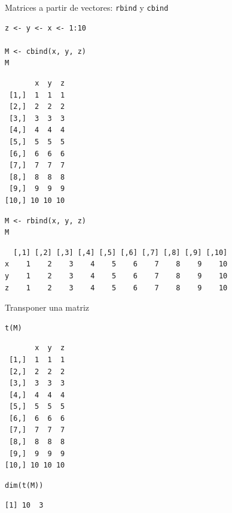 \documentclass[xcolor={usenames,svgnames,dvipsnames}]{beamer}
\begin{document}
\begin{frame}[fragile,label=sec-2-2-2]{Matrices a partir de vectores: \texttt{rbind} y \texttt{cbind}}
 \lstset{language=R,label= ,caption= ,numbers=none}
\begin{lstlisting}
z <- y <- x <- 1:10

M <- cbind(x, y, z)
M
\end{lstlisting}

\begin{verbatim}
       x  y  z
 [1,]  1  1  1
 [2,]  2  2  2
 [3,]  3  3  3
 [4,]  4  4  4
 [5,]  5  5  5
 [6,]  6  6  6
 [7,]  7  7  7
 [8,]  8  8  8
 [9,]  9  9  9
[10,] 10 10 10
\end{verbatim}

\lstset{language=R,label= ,caption= ,numbers=none}
\begin{lstlisting}
M <- rbind(x, y, z)
M
\end{lstlisting}

\begin{verbatim}
  [,1] [,2] [,3] [,4] [,5] [,6] [,7] [,8] [,9] [,10]
x    1    2    3    4    5    6    7    8    9    10
y    1    2    3    4    5    6    7    8    9    10
z    1    2    3    4    5    6    7    8    9    10
\end{verbatim}
\end{frame}

\begin{frame}[fragile,label=sec-2-2-3]{Transponer una matriz}
 \lstset{language=R,label= ,caption= ,numbers=none}
\begin{lstlisting}
t(M)
\end{lstlisting}

\begin{verbatim}
       x  y  z
 [1,]  1  1  1
 [2,]  2  2  2
 [3,]  3  3  3
 [4,]  4  4  4
 [5,]  5  5  5
 [6,]  6  6  6
 [7,]  7  7  7
 [8,]  8  8  8
 [9,]  9  9  9
[10,] 10 10 10
\end{verbatim}


\lstset{language=R,label= ,caption= ,numbers=none}
\begin{lstlisting}
dim(t(M))
\end{lstlisting}

\begin{verbatim}
[1] 10  3
\end{verbatim}
\end{frame}
\end{document}
